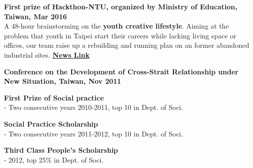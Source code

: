 \begin{cventries}
  \cventry
    {}
    {}
    {}
    {}
    {
      \begin{cvitems}
        \item {\textbf{First prize of Hackthon-NTU, organized by Ministry of Education, Taiwan, Mar 2016} \\ %
        A 48-hour brainstorming on the \textbf{youth creative lifestyle}. Aiming at the problem that youth in Taipei start their careers while lacking living space or offices, our team raise up a rebuilding and running plan on an former abandoned industrial sites. %
        \href{https:www.bp.ntu.edu.tw/?p=3647}{\textbf{News Link}} }
        \item {\textbf{Conference on the Development of Cross-Strait Relationship under New Situation, Taiwan, Nov 2011} }
        \item {\textbf{First Prize of Social practice} \\ 
        - Two consecutive years 2010-2011, top 10 in Dept. of Soci.
        }
        \item {\textbf{Social Practice Scholarship } \\ 
        - Two consecutive years 2011-2012, top 10 in Dept. of Soci.}        
        \item {\textbf{Third Class People's Scholarship } \\ 
        - 2012, top 25\% in Dept. of Soci.}
      \end{cvitems}
    }
\end{cventries}
